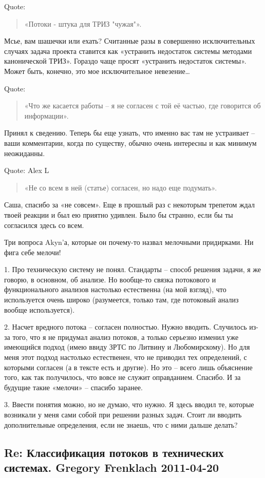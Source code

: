 \documentclass[a4paper,11pt]{article}
\begin{document}
Quote:
\begin{quote}
  «Потоки - штука для ТРИЗ "чужая"». 
\end{quote}
Мсье, вам шашечки или ехать? Считанные разы в совершенно исключительных
случаях задача проекта ставится как «устранить недостаток системы методами
канонической ТРИЗ». Гораздо чаще просят «устранить недостаток системы». Может
быть, конечно, это мое исключительное невезение…

Quote:
\begin{quote}
  «Что же касается работы -- я не согласен с той её частью, где говорится об
  информации».
\end{quote}
Принял к сведению. Теперь бы еще узнать, что именно вас там не устраивает –
ваши комментарии, когда по существу, обычно очень интересны и как минимум
неожиданны.

Quote: Alex L
\begin{quote}
  «Не со всем в ней (статье) согласен, но надо еще подумать». 
\end{quote}
Саша, спасибо за «не совсем». Еще в прошлый раз с некоторым трепетом ждал
твоей реакции и был ею приятно удивлен. Было бы странно, если бы ты согласился
здесь со всем.

Три вопроса Akyn'а, которые он почему-то назвал мелочными придирками. Ни фига
себе мелочи!

1. Про техническую систему не понял. Стандарты – способ решения задачи, я же
говорю, в основном, об анализе. Но вообще-то связка потокового и
функционального анализов настолько естественна (на мой взгляд), что
используется очень широко (разумеется, только там, где потоковый анализ вообще
используется).

2. Насчет вредного потока – согласен полностью. Нужно вводить. Случилось из-за
того, что я не придумал анализ потоков, а только серьезно изменил уже
имеющийся подход (имею ввиду ЗРТС по Литвину и Любомирскому). Но для меня этот
подход настолько естественен, что не приводил тех определений, с которыми
согласен (а в тексте есть и другие). Но это – всего лишь объяснение того, как
так получилось, что вовсе не служит оправданием. Спасибо. И за будущие такие
«мелочи» -- спасибо заранее.

3. Ввести понятия можно, но не думаю, что нужно. Я здесь вводил те, которые
возникали у меня сами собой при решении разных задач. Стоит ли вводить
дополнительные определения, если не знаешь, что с ними дальше делать?

\subsection*{Re: Классификация потоков в технических системах.  Gregory
  Frenklach 2011-04-20}
\end{document}
